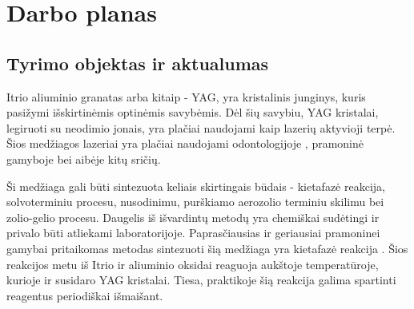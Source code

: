 \documentclass[]{VUMIFTemplateClass}
\begin{document}

\onehalfspacing


\section{Darbo planas}

\subsection{Tyrimo objektas ir aktualumas}



Itrio aliuminio granatas arba kitaip - YAG, yra kristalinis junginys, kuris pasižymi išskirtinėmis optinėmis savybėmis. Dėl šių savybiu, YAG kristalai, legiruoti su neodimio jonais, yra plačiai naudojami kaip lazerių aktyvioji terpė. Šios medžiagos lazeriai yra plačiai naudojami odontologijoje \cite{valentiUseErYAG2021}, pramoninė gamyboje \cite{dubeyExperimentalStudyNd2008} bei aibėje kitų sričių.

Ši medžiaga gali būti sintezuota keliais skirtingais būdais - kietafazė reakcija, solvoterminiu procesu, nusodinimu, purškiamo aerozolio terminiu skilimu bei zolio-gelio procesu. Daugelis iš išvardintų metodų yra chemiškai sudėtingi ir privalo būti atliekami laboratorijoje. Paprasčiausias ir geriausiai pramoninei gamybai pritaikomas metodas sintezuoti šią medžiaga yra kietafazė reakcija \cite{zhangNovelSynthesisYAG2005}. Šios reakcijos metu iš Itrio ir aliuminio oksidai reaguoja aukštoje temperatūroje, kurioje ir susidaro YAG kristalai. Tiesa, praktikoje šią reakcija galima spartinti reagentus periodiškai išmaišant.
\end{document}
